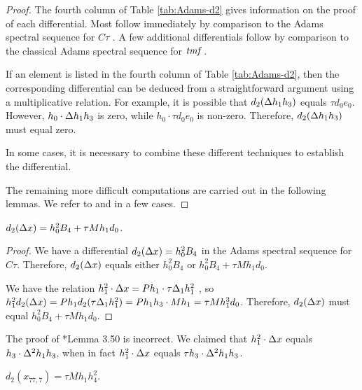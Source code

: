 \begin{proof}
The fourth column of Table \ref{tab:Adams-d2} gives information on the
proof of each differential.
Most follow immediately by comparison to
the Adams spectral sequence for $C\tau$
.
A few additional differentials follow by comparison to the classical
Adams spectral sequence for $\textit{tmf}$ .

If an element is listed in the fourth column of Table \ref{tab:Adams-d2}, 
then the corresponding differential can be deduced from a straightforward
argument using a multiplicative relation.  For example, it is possible
that $d_2(\Delta h_1 h_3)$ equals $\tau d_0 e_0$.  However,
$h_0 \cdot \Delta h_1 h_3$ is zero, while $h_0 \cdot \tau d_0 e_0$ is non-zero.
Therefore, $d_2(\Delta h_1 h_3)$ must equal zero.

In some cases, it is necessary to combine these different techniques to
establish the differential.

The remaining more difficult computations are carried out in the
following lemmas.  We refer to \cite{Chua21} and \cite{BF21} in
a few cases.
\end{proof}


\begin{lemma}
\label{lem:d2-Dx}
$d_2(\Delta x) = h_0^2 B_4 + \tau M h_1 d_0$.
\end{lemma}

\begin{proof}
We have a differential $d_2(\Delta x) = h_0^2 B_4$ in the
Adams spectral sequence for $C\tau$.
Therefore, $d_2(\Delta x)$ equals either
$h_0^2 B_4$ or $h_0^2 B_4 + \tau M h_1 d_0$.

We have the relation
$h_1^2 \cdot \Delta x = P h_1 \cdot \tau \Delta_1 h_1^2$
, so
$h_1^2 d_2(\Delta x) = P h_1 d_2(\tau \Delta_1 h_1^2) = 
P h_1 h_3 \cdot M h_1 = \tau M h_1^3 d_0$.
Therefore, $d_2(\Delta x)$ must equal
$h_0^2 B_4 + \tau M h_1 d_0$.
\end{proof}

\begin{remark}
The proof of \cite{Isaksen14c}*{Lemma 3.50}
is incorrect.  We claimed that
$h_1^2 \cdot \Delta x$ equals $h_3 \cdot \Delta^2 h_1 h_3$,
when in fact
$h_1^2 \cdot \Delta x$ equals $\tau h_3 \cdot \Delta^2 h_1 h_3$.
\end{remark}

\begin{lemma}
\label{lem:d2-x77,7}
$d_2(x_{77,7}) = \tau M h_1 h_4^2$.
\end{lemma}


